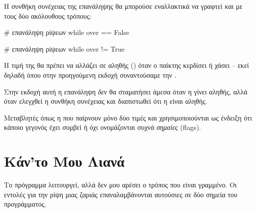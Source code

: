 \documentclass[a4paper,11pt,oneside]{book}
\begin{document}

Η συνθήκη συνέχειας της επανάληψης θα μπορούσε εναλλακτικά να γραφτεί και με τους δύο ακόλουθους τρόπους:

\begin{pycode}
    # επανάληψη ρίψεων
    while over == False
\end{pycode}

%
\begin{pycode}
    # επανάληψη ρίψεων
    while over != True
\end{pycode}

Η τιμή της  θα πρέπει να αλλάζει σε αληθής () όταν ο παίκτης κερδίσει ή χάσει -- εκεί δηλαδή όπου στην προηγούμενη εκδοχή συναντούσαμε την . 


Στην εκδοχή αυτή η επανάληψη \emph{δεν} θα σταματήσει άμεσα όταν η  γίνει αληθής, αλλά όταν ελεγχθεί η συνθήκη συνέχειας και διαπιστωθεί ότι η  είναι αληθής.

Μεταβλητές όπως η  που παίρνουν μόνο δύο τιμές και χρησιμοποιούνται ως ένδειξη ότι κάποιο γεγονός έχει συμβεί ή όχι ονομάζονται συχνά \emph{σημαίες} (flags).


\section{Κάν'το Μου Λιανά}

\begin{question}
Το πρόγραμμα λειτουργεί, αλλά δεν μου αρέσει ο τρόπος που είναι γραμμένο. Οι εντολές για την ρίψη μιας ζαριάς επαναλαμβάνονται αυτούσιες σε δύο σημεία του προγράμματος. 
\end{question}
\end{document}
